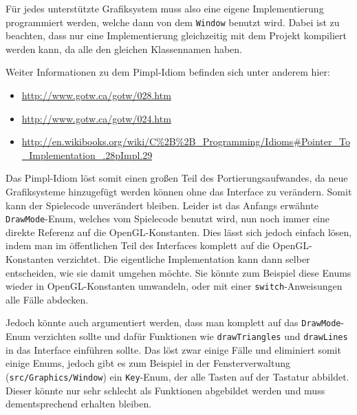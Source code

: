 \documentclass[12pt, a4paper, titlepage, hidelinks]{scrreprt}
\begin{document}

Für jedes unterstützte Grafiksystem muss also eine eigene Implementierung programmiert werden, welche dann von dem \texttt{Window} benutzt wird. Dabei ist zu beachten, dass nur eine Implementierung gleichzeitig mit dem Projekt kompiliert werden kann, da alle den gleichen Klassennamen haben.


Weiter Informationen zu dem Pimpl-Idiom befinden sich unter anderem hier:
\begin{itemize}
\item \url{http://www.gotw.ca/gotw/028.htm}
\item \url{http://www.gotw.ca/gotw/024.htm}
\item \url{http://en.wikibooks.org/wiki/C%2B%2B_Programming/Idioms#Pointer_To_Implementation_.28pImpl.29}
\end{itemize}

Das Pimpl-Idiom löst somit einen großen Teil des Portierungsaufwandes, da neue Grafiksysteme hinzugefügt werden können ohne das Interface zu verändern. Somit kann der Spielecode unverändert bleiben. Leider ist das Anfangs erwähnte \texttt{DrawMode}-Enum, welches vom Spielecode benutzt wird, nun noch immer eine direkte Referenz auf die OpenGL-Konstanten. Dies lässt sich jedoch einfach lösen, indem man im öffentlichen Teil des Interfaces komplett auf die OpenGL-Konstanten verzichtet. Die eigentliche Implementation kann dann selber entscheiden, wie sie damit umgehen möchte. Sie könnte zum Beispiel diese Enums wieder in OpenGL-Konstanten umwandeln, oder mit einer \texttt{switch}-Anweisungen alle Fälle abdecken. 

Jedoch könnte auch argumentiert werden, dass man komplett auf das \texttt{DrawMode}-Enum verzichten sollte und dafür Funktionen wie \texttt{drawTriangles} und \texttt{drawLines} in das Interface einführen sollte. Das löst zwar einige Fälle und eliminiert somit einige Enums, jedoch gibt es zum Beispiel in der Fensterverwaltung (\texttt{src/Graphics/Window}) ein \texttt{Key}-Enum, der alle Tasten auf der Tastatur abbildet. Dieser könnte nur sehr schlecht als Funktionen abgebildet werden und muss dementsprechend erhalten bleiben.
\end{document}

